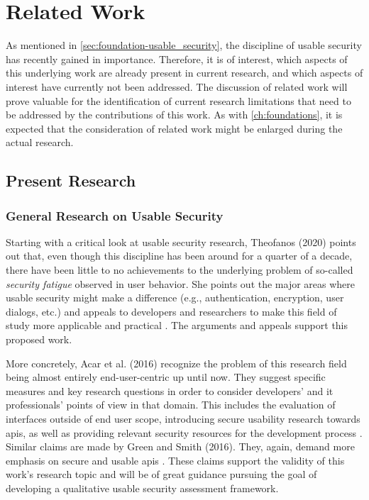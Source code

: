 \chapter{Related Work}
\label{ch:related-work}

As mentioned in \autoref{sec:foundation-usable_security}, the discipline of usable security has recently gained in importance. Therefore, it is of interest, which aspects of this underlying work are already present in current research, and which aspects of interest have currently not been addressed. The discussion of related work will prove valuable for the identification of current research limitations that need to be addressed by the contributions of this work. As with \autoref{ch:foundations}, it is expected that the consideration of related work might be enlarged during the actual research.

\section{Present Research}

\subsection{General Research on Usable Security}

Starting with a critical look at usable security research, Theofanos (2020) points out that, even though this discipline has been around for a quarter of a decade, there have been little to no achievements to the underlying problem of so-called \textit{security fatigue} observed in user behavior. She points out the major areas where usable security might make a difference (e.g., authentication, encryption, user dialogs, etc.) and appeals to developers and researchers to make this field of study more applicable and practical \cite{theofanos_is_2020}. The arguments and appeals support this proposed work.

More concretely, Acar et al. (2016) recognize the problem of this research field being almost entirely end-user-centric up until now. They suggest specific measures and key research questions in order to consider developers' and \ac{it} professionals' points of view in that domain. This includes the evaluation of interfaces outside of end user scope, introducing secure usability research towards \acp{api}, as well as providing relevant security resources for the development process \cite{acar_you_2016}. Similar claims are made by Green and Smith (2016). They, again, demand more emphasis on secure and usable \acp{api} \cite{green_developers_2016}. These claims support the validity of this work's research topic and will be of great guidance pursuing the goal of developing a qualitative usable security assessment framework.

